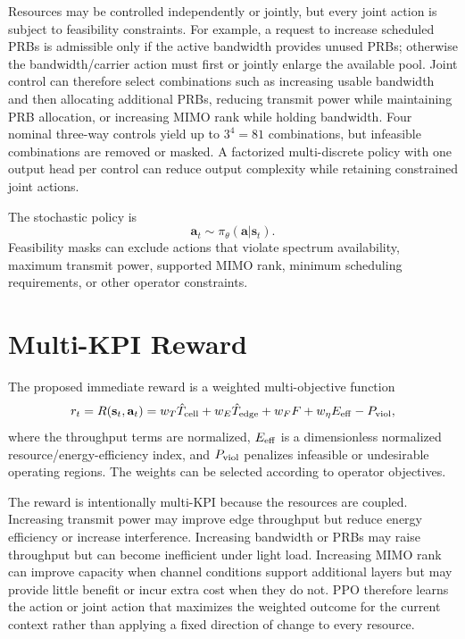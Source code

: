 \documentclass[conference]{IEEEtran}
\begin{document}
Resources may be controlled independently or jointly, but every joint action is subject to feasibility constraints. For example, a request to increase scheduled PRBs is admissible only if the active bandwidth provides unused PRBs; otherwise the bandwidth/carrier action must first or jointly enlarge the available pool. Joint control can therefore select combinations such as increasing usable bandwidth and then allocating additional PRBs, reducing transmit power while maintaining PRB allocation, or increasing MIMO rank while holding bandwidth. Four nominal three-way controls yield up to $3^4=81$ combinations, but infeasible combinations are removed or masked. A factorized multi-discrete policy with one output head per control can reduce output complexity while retaining constrained joint actions.

The stochastic policy is
\begin{equation}
\mathbf{a}_t\sim\pi_\theta(\mathbf{a}|\mathbf{s}_t).
\end{equation}
Feasibility masks can exclude actions that violate spectrum availability, maximum transmit power, supported MIMO rank, minimum scheduling requirements, or other operator constraints.

\section{Multi-KPI Reward}
The proposed immediate reward is a weighted multi-objective function
\begin{equation}
r_t=R(\mathbf{s}_t,\mathbf{a}_t)
=w_T\hat T_{\rm cell}
+w_E\hat T_{\rm edge}
+w_F F
+w_\eta E_{\rm eff}
-P_{\rm viol},
\end{equation}
where the throughput terms are normalized, $E_{\rm eff}$ is a dimensionless normalized resource/energy-efficiency index, and $P_{\rm viol}$ penalizes infeasible or undesirable operating regions. The weights can be selected according to operator objectives.

The reward is intentionally multi-KPI because the resources are coupled. Increasing transmit power may improve edge throughput but reduce energy efficiency or increase interference. Increasing bandwidth or PRBs may raise throughput but can become inefficient under light load. Increasing MIMO rank can improve capacity when channel conditions support additional layers but may provide little benefit or incur extra cost when they do not. PPO therefore learns the action or joint action that maximizes the weighted outcome for the current context rather than applying a fixed direction of change to every resource.
\end{document}
